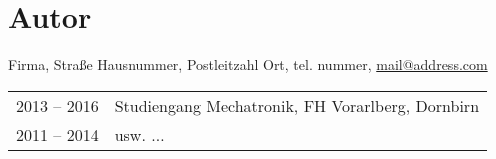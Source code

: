 \documentclass[./\jobname.tex]{subfiles}
\begin{document}
%
	\section*{Autor}
	\vskip 9pt
	\noindent
	\begin{minipage}{0.1\columnwidth}%
	\end{minipage}\hspace{5mm}\hfill
	\begin{minipage}{0.9\columnwidth}%
		\supervisorName \supervisorSurname%
		\vskip 9pt%
		Firma, %
		Straße Hausnummer, %
		Postleitzahl Ort, %
		tel. nummer, %
		\href{mailto:mail@address.com}{mail@address.com}%
		\vskip 9pt%
		\begin{tabular}{@{}ll}
			2013 – 2016	& Studiengang Mechatronik, FH Vorarlberg, Dornbirn\\ 
			2011 – 2014	& usw. \(\ldots\)
		\end{tabular}
	\end{minipage}%

%
\end{document}
